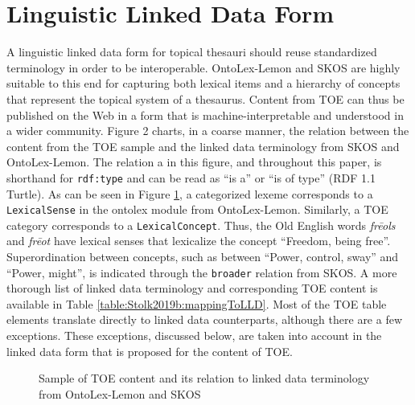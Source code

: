 \section{Linguistic Linked Data Form}
A linguistic linked data form for topical thesauri should reuse standardized terminology in order to be interoperable. OntoLex-Lemon and SKOS are highly suitable to this end for capturing both lexical items and a hierarchy of concepts that represent the topical system of a thesaurus. Content from TOE can thus be published on the Web in a form that is machine-interpretable and understood in a wider community. Figure 2 charts, in a coarse manner, the relation between the content from the TOE sample and the linked data terminology from SKOS and OntoLex-Lemon. The relation a in this figure, and throughout this paper, is shorthand for \texttt{rdf:type} and can be read as “is a” or “is of type” (RDF 1.1 Turtle). As can be seen in Figure \ref{fig:Stolk2019b:TOE-sample-LLD}, a categorized lexeme corresponds to a \texttt{LexicalSense} in the ontolex module from OntoLex-Lemon. Similarly, a TOE category corresponds to a \texttt{LexicalConcept}. Thus, the Old English words \textit{frēols} and \textit{frēot} have lexical senses that lexicalize the concept “Freedom, being free”. Superordination between concepts, such as between “Power, control, sway” and “Power, might”, is indicated through the \texttt{broader} relation from SKOS. A more thorough list of linked data terminology and corresponding TOE content is available in Table \ref{table:Stolk2019b:mappingToLLD}. Most of the TOE table elements translate directly to linked data counterparts, although there are a few exceptions. These exceptions, discussed below, are taken into account in the linked data form that is proposed for the content of TOE.
 
\begin{figure}[htbp]
	\framebox[\textwidth]{
		\scalebox{0.65}[0.65]{
%			
		}
	}
	\caption[]{\label{fig:Stolk2019b:TOE-sample-LLD} Sample of TOE content and its relation to linked data terminology from OntoLex-Lemon and SKOS}
\end{figure}

